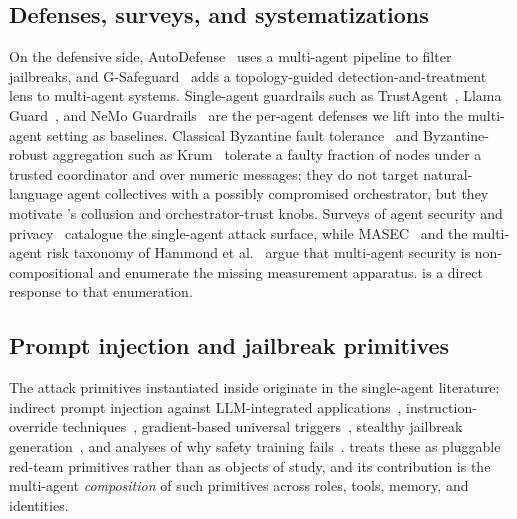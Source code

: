 \subsection{Defenses, surveys, and systematizations}
On the defensive side, AutoDefense~\cite{zeng2024autodefense} uses a multi-agent
pipeline to filter jailbreaks, and G-Safeguard~\cite{yu2025gsafeguard} adds a
topology-guided detection-and-treatment lens to multi-agent systems.
Single-agent guardrails such as TrustAgent~\cite{hua2024trustagent}, Llama
Guard~\cite{inan2023llamaguard}, and NeMo Guardrails~\cite{rebedea2023nemo} are the
per-agent defenses we lift into the multi-agent setting as baselines. Classical Byzantine fault tolerance~\cite{lamport1982byzantine,pease1980reaching} and
Byzantine-robust aggregation such as Krum~\cite{blanchard2017krum} tolerate a faulty fraction
of nodes under a trusted coordinator and over numeric messages; they do not target
natural-language agent collectives with a possibly compromised orchestrator, but they motivate
's collusion and orchestrator-trust knobs. Surveys of agent
security and privacy~\cite{he2025emerged,li2024personalllmagents} catalogue the
single-agent attack surface, while MASEC~\cite{schroederdewitt2025masec} and the
multi-agent risk taxonomy of Hammond et al.~\cite{hammond2025multiagent} argue that
multi-agent security is non-compositional and enumerate the missing measurement
apparatus.  is a direct response to that enumeration.

\subsection{Prompt injection and jailbreak primitives}
The attack primitives instantiated inside  originate in the single-agent
literature: indirect prompt injection against LLM-integrated
applications~\cite{greshake2023indirect,liu2023houyi}, instruction-override
techniques~\cite{perez2022ignore}, gradient-based universal
triggers~\cite{zou2023universal}, stealthy jailbreak
generation~\cite{liu2024autodan}, and analyses of why safety training
fails~\cite{wei2023jailbroken}.  treats these as pluggable red-team
primitives rather than as objects of study, and its contribution is the multi-agent
\emph{composition} of such primitives across roles, tools, memory, and identities.

